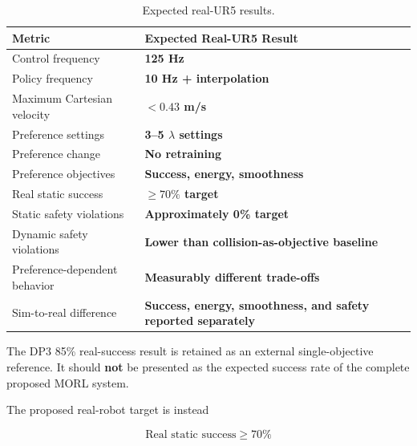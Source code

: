 \documentclass[journal]{IEEEtran}
\begin{document}
\begin{table}[t]
\centering
\caption{Expected real-UR5 results.}
\label{tab:real_robot}
\renewcommand{\arraystretch}{1.25}

\footnotesize

\begin{tabular}{l l}
\toprule
\textbf{Metric}
&
\textbf{Expected Real-UR5 Result}
\\
\midrule

Control frequency
&
\textbf{125 Hz}
\\

Policy frequency
&
\textbf{10 Hz + interpolation}
\\

Maximum Cartesian velocity
&
\textbf{$<0.43$ m/s}
\\

Preference settings
&
\textbf{3--5 $\lambda$ settings}
\\

Preference change
&
\textbf{No retraining}
\\

Preference objectives
&
\textbf{Success, energy, smoothness}
\\

Real static success
&
\textbf{$\geq70\%$ target}
\\

Static safety violations
&
\textbf{Approximately 0\% target}
\\

Dynamic safety violations
&
\textbf{Lower than collision-as-objective baseline}
\\

Preference-dependent behavior
&
\textbf{Measurably different trade-offs}
\\

Sim-to-real difference
&
\textbf{Success, energy, smoothness, and safety reported separately}
\\

\bottomrule
\end{tabular}
\end{table}

The DP3 85\% real-success result is retained as an external
single-objective reference. It should \textbf{not} be presented as the
expected success rate of the complete proposed MORL system.

The proposed real-robot target is instead

\begin{equation}
\boxed{
\text{Real static success} \geq 70\%
}
\end{equation}
\end{document}
